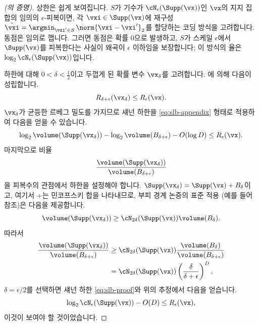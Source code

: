 \documentclass[../../book-main_ko.tex]{subfiles}
\begin{document}
\begin{proof}[(의 증명)]
    상한은 쉽게 보여집니다. \(S\)가 기수가 \(\cN_{\epsilon}(\Supp(\vx))\)인 \(\vx\)의 지지 집합의 임의의 \(\epsilon\)-피복이면, 각 \(\vxi \in \Supp(\vx)\)에 재구성 \(\hat{\vxi} = \argmin_{\vxi' \in S}\, \norm{\vxi - \vxi'}_2\)를 할당하는 코딩 방식을 고려합니다. 동점은 임의로 깹니다. 그러면 동점은 확률 0으로 발생하고, \(S\)가 스케일 \(\epsilon\)에서 \(\Supp(\vx)\)를 피복한다는 사실이 왜곡이 \(\epsilon\) 이하임을 보장합니다; 이 방식의 율은 \(\log_2 \cN_{\epsilon}(\Supp(\vx))\)입니다.

    하한에 대해 \(0 < \delta < \tfrac{1}{2}\)이고 두껍게 된 확률 변수 \(\vx_{\delta}\)를 고려합니다. 에 의해 다음이 성립합니다.
    \begin{equation}
        R_{\delta + \epsilon}(\vx_{\delta})
        \leq
        R_{\epsilon}(\vx).
    \end{equation}
    \(\vx_{\delta}\)가 균등한 르베그 밀도를 가지므로 섀넌 하한을 \eqref{eq:slb-appendix} 형태로 적용하여 다음을 얻을 수 있습니다.
    \begin{equation}\label{eq:slb-proof}
        \log_2 \volume(\Supp(\vx_{\delta}))
        - \log_2 \volume(B_{\delta + \epsilon})
        - O(\log D)
        \leq
        R_{\epsilon}(\vx).
    \end{equation}
    마지막으로 비율
    \begin{equation}
        \frac{
            \volume(\Supp(\vx_{\delta}))
        }
        {
            \volume(B_{\delta + \epsilon})
        }
    \end{equation}
    을 피복수의 관점에서 하한을 설정해야 합니다.
    \(\Supp(\vx_{\delta}) = \Supp(\vx) + B_{\delta}\)이고, 여기서 \(+\)는 민코프스키 합을 나타내므로, 부피 경계 논증의 표준 적용 (예를 들어 \cite[명제 4.2.12]{Vershynin2018-br} 참조)은 다음을 제공합니다.
    \begin{equation}
        \volume(\Supp(\vx_{\delta}))
        \geq
        \cN_{2\delta}(\Supp(\vx))
        \volume(B_{\delta}).
    \end{equation}
    따라서
    \begin{align}
        \frac{
            \volume(\Supp(\vx_{\delta}))
        }
        {
            \volume(B_{\delta + \epsilon})
        }
        &\geq
        \cN_{2\delta}(\Supp(\vx))
        \frac{
            \volume(B_{\delta})
        }
        {
            \volume(B_{\delta + \epsilon})
        }
        \\
        &=
        \cN_{2\delta}(\Supp(\vx))
        \left(
            \frac{
                \delta
            }
            {
                \delta + \epsilon
            }
        \right)^D.
    \end{align}
    \(\delta = \epsilon / 2\)를 선택하면 섀넌 하한 \eqref{eq:slb-proof}와 위의 추정에서 다음을 얻습니다.
    \begin{equation}
        \log_2 \cN_{\epsilon}(\Supp(\vx))
        - O(D)
        \leq
        R_{\epsilon}(\vx),
    \end{equation}
    이것이 보여야 할 것이었습니다.

\end{proof}
\end{document}
